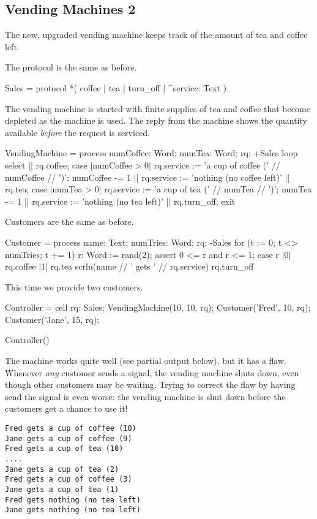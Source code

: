 \subsection{Vending Machines 2}\label{sec-vm-2}

The new, upgraded vending machine keeps track of the amount of tea and coffee left.

The protocol is the same as before.
\begin{code}
Sales = protocol { *( coffee | tea | turn_off | ^service: Text ) }    
\end{code}

The vending machine is started with finite supplies of tea and coffee that become depleted as the machine is used.  The reply from the machine shows the quantity available \emph{before} the request is serviced.
\begin{code}
VendingMachine = process numCoffee: Word; numTea: Word; rq: +Sales
{
    loop select
    {
        ||  rq.coffee; 
            case
            {
                |numCoffee > 0| 
                    rq.service := 'a cup of coffee (' // numCoffee // ')';
                                numCoffee -= 1
                || rq.service := 'nothing (no coffee left)'
            }
        ||  rq.tea; 
            case
            {
                |numTea > 0| rq.service := 'a cup of tea (' // numTea // ')';
                                numTea -= 1
                || rq.service := 'nothing (no tea left)'
            }
        ||  rq.turn_off; exit
    }
}
\end{code}

Customers are the same as before.
\begin{code}
Customer = process name: Text; numTries: Word; rq: -Sales
{
    for (t := 0; t <> numTries; t += 1)
    {
        r: Word := rand(2);
        assert 0 <= r and r <= 1;
        case r
        {
            |0| rq.coffee
            |1| rq.tea
        }
        scrln(name // ' gets ' // rq.service)
    }
    rq.turn_off
}
\end{code}

This time we provide two customers.
\begin{code}
Controller = cell
{
    rq: Sales;
    VendingMachine(10, 10, rq);
    Customer('Fred', 10, rq);
    Customer('Jane', 15, rq);
}
\end{code}

\begin{code}
Controller()
\end{code}

The machine works quite well (see partial output below), but it has a flaw.  Whenever \emph{any} customer sends a  signal, the vending machine shuts down, even though other customers may be waiting.  Trying to correct the flaw by having  send the  signal is even worse: the vending machine is shut down before the customers get a chance to use it!
\begin{verbatim}
Fred gets a cup of coffee (10)
Jane gets a cup of coffee (9)
Fred gets a cup of tea (10)
....
Jane gets a cup of tea (2)
Fred gets a cup of coffee (3)
Jane gets a cup of tea (1)
Fred gets nothing (no tea left)
Jane gets nothing (no tea left)
\end{verbatim}
